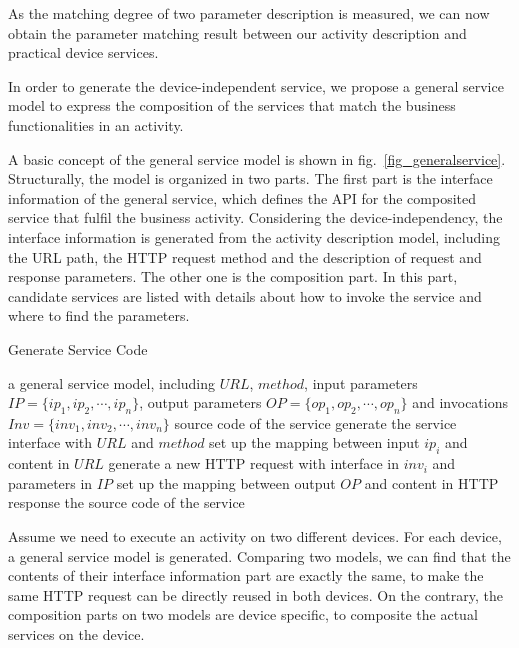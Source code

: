 As the matching degree of two parameter description is measured, we can now obtain the parameter matching result between our activity description and practical device services. 

In order to generate the device-independent service, we propose a general service model to express the composition of the services that match the business functionalities in an activity. 

A basic concept of the general service model is shown in fig.~\ref{fig_generalservice}. Structurally, the model is organized in two parts. The first part is the interface information of the general service, which defines the API for the composited service that fulfil the business activity. Considering the device-independency, the interface information is generated from the activity description model, including the URL path, the HTTP request method and the description of request and response parameters. The other one is the composition part. In this part, candidate services are listed with details about how to invoke the service and where to find the parameters. 

 \begin{algorithm}
        \caption{Generate Service Code}
        \begin{algorithmic}[1] 
            \Require a general service model, including $URL$, $method$, input parameters $IP = \{ ip_1, ip_2,\cdots,ip_n\}$, output parameters $OP = \{ op_1, op_2,\cdots,op_n\}$ and invocations $Inv = \{ inv_1, inv_2,\cdots,inv_n\}$
            \Ensure source code of the service
            \State generate the service interface with $URL$ and $method$
            		\State set up the mapping between input $ip_i$ and content in $URL$
            \EndFor
            		\State generate a new HTTP request with interface in $inv_i$ and parameters in $IP$
            		\State set up the mapping between output $OP$ and content in HTTP response
            \EndFor
            \State
            \Return the source code of the service
        \end{algorithmic}
        \label{al_generating}
 \end{algorithm}
 
Assume we need to execute an activity on two different devices. For each device, a general service model is generated. Comparing two models, we can find that the contents of their interface information part are exactly the same, to make the same HTTP request can be directly reused in both devices. On the contrary, the composition parts on two models are device specific, to composite the actual services on the device. 

